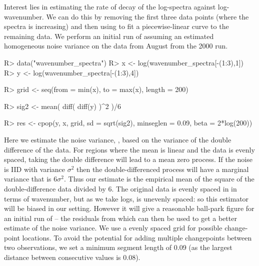 \documentclass[nojss]{jss}
\begin{document}
Interest lies in estimating the rate of decay of the log-spectra against log-wavenumber. We can do this by removing the first three data points (where the spectra is increasing) and then using  to fit a piecewise-linear curve to the remaining data. We perform an initial run of  assuming an estimated homogeneous noise variance on the data from August from the 2000 run.
\begin{CodeChunk}
\begin{CodeInput}
R> data("wavenumber_spectra")
R> x <- log(wavenumber_spectra[-(1:3),1])
R> y <- log(wavenumber_spectra[-(1:3),4])

R> grid <- seq(from = min(x), to = max(x), length = 200)

R> sig2 <- mean( diff( diff(y) )^2 )/6 

R> res <- cpop(y, x, grid, sd = sqrt(sig2), minseglen = 0.09, beta = 2*log(200))
\end{CodeInput}
\end{CodeChunk}
Here we estimate the noise variance, , based on the variance of the double difference of the data. For regions where the mean is linear and the data is evenly spaced, taking the double difference will lead to a mean zero process. If the noise is IID with variance $\sigma^2$ then the double-differenced process will have a marginal variance that is $6\sigma^2$. Thus our estimate is the empirical mean of the square of the double-difference data divided by 6. The original data is evenly spaced in in terms of wavenumber, but as we take logs,  is unevenly spaced: so this estimator will be biased in our setting. However it will give a reasonable ball-park figure for an initial run of  -- the residuals from which can then be used to get a better estimate of the noise variance. We use a evenly spaced grid for possible change-point locations. To avoid the potential for adding multiple changepoints between two observations, we set a minimum segment length of 0.09 (as the largest distance between consecutive  values is 0.08).
\end{document}
